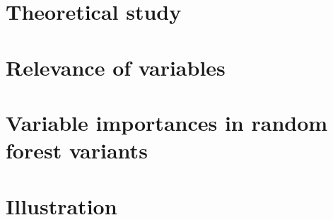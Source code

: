 \section{Theoretical study}
\label{sec:6:theory}


\section{Relevance of variables}
\label{sec:6:variable-relevance}


\section{Variable importances in random forest variants}
\label{sec:6:variants}


\section{Illustration}
\label{sec:6:illustration}

